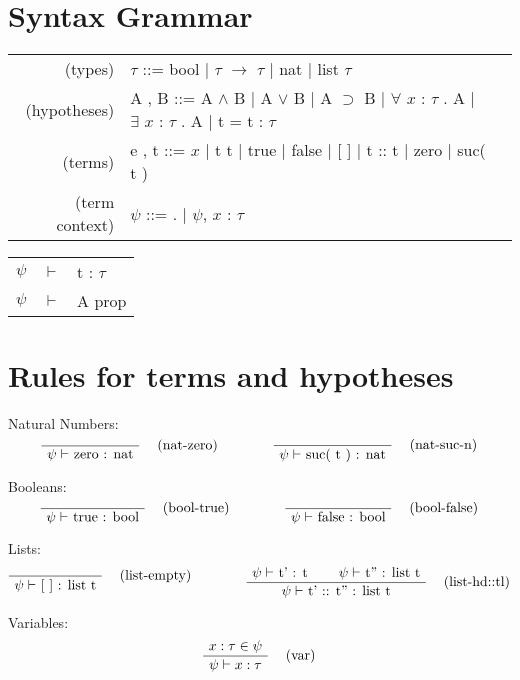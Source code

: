 \documentclass[twoside,a4paper]{article}
\begin{document}
\maketitle

\section{Syntax Grammar}
\begin{center}
\begin{tabular}{rll}
(types)& $\tau$ ::= bool | $\tau$ $\rightarrow$ $\tau $ | nat | list $\tau$
\\
(hypotheses)& A , B ::= A $\wedge$ B | A $\vee$ B | A $\supset$ B 
| $\forall$ $x$ : $\tau$ . A | $\exists$ $x$ : $\tau$ . A
| t = t : $\tau$
\\
(terms)& e , t ::= $x$ | t t | true | false 
| [ ] | t :: t  %
| zero | suc( t ) %
\\
(term context)& $\psi$ ::= . | $\psi$, $x$ : $\tau$
\end{tabular}

\begin{tabular}{rll}
$\psi$ &$\vdash$ & t : $\tau$\\
$\psi$ &$\vdash$ & A prop
\end{tabular}
\end{center}

\section{Rules for terms and hypotheses}

Natural Numbers:
\[
\AxiomC{}
\RightLabel{\quad (nat-zero)}
\UnaryInfC{$\psi \vdash$ zero : nat}
\DisplayProof
\qquad
\qquad
\AxiomC{}
\RightLabel{\quad (nat-suc-n)}
\UnaryInfC{$\psi \vdash$ suc( t ) : nat}
\DisplayProof
\]

Booleans:
\[
\AxiomC{}
\RightLabel{\quad (bool-true)}
\UnaryInfC{$\psi \vdash$ true : bool}
\DisplayProof
\qquad
\qquad
\AxiomC{}
\RightLabel{\quad (bool-false)}
\UnaryInfC{$\psi \vdash$ false : bool}
\DisplayProof
\]

Lists:
\[
\AxiomC{}
\RightLabel{\quad (list-empty)}
\UnaryInfC{$\psi \vdash$ [ ] : list t}
\DisplayProof
\qquad
\qquad
\AxiomC{$\psi \vdash$ t' : t}
\AxiomC{$\psi \vdash$ t'' : list t}
\RightLabel{\quad (list-hd::tl)}
\BinaryInfC{$\psi \vdash$ t' :: t'' : list t}
\DisplayProof
\]

Variables:
\[
\AxiomC{$x : \tau \in \psi$}
\RightLabel{\quad (var)}
\UnaryInfC{$\psi \vdash x : \tau$}
\DisplayProof
\]
\end{document}
